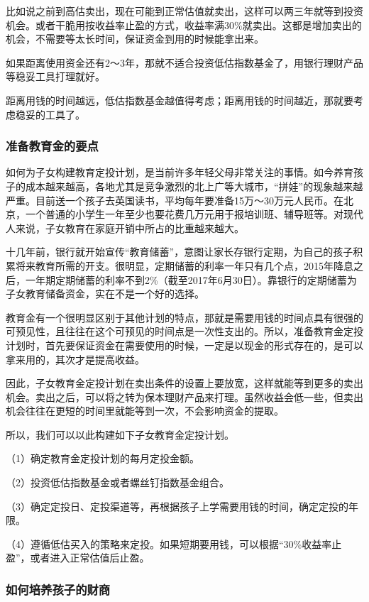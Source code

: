 比如说之前到高估卖出，现在可能到正常估值就卖出，这样可以两三年就等到投资机会。或者干脆用按收益率止盈的方式，收益率满30\%就卖出。这都是增加卖出的机会，不需要等太长时间，保证资金到用的时候能拿出来。

如果距离使用资金还有2～3年，那就不适合投资低估指数基金了，用银行理财产品等稳妥工具打理就好。

距离用钱的时间越远，低估指数基金越值得考虑；距离用钱的时间越近，那就要考虑稳妥的工具了。

\subsubsection{准备教育金的要点}

如何为子女构建教育定投计划，是当前许多年轻父母非常关注的事情。如今养育孩子的成本越来越高，各地尤其是竞争激烈的北上广等大城市，“拼娃”的现象越来越严重。目前送一个孩子去英国读书，平均每年要准备15万～30万元人民币。在北京，一个普通的小学生一年至少也要花费几万元用于报培训班、辅导班等。对现代人来说，子女教育在家庭开销中所占的比重越来越大。

十几年前，银行就开始宣传“教育储蓄”，意图让家长存银行定期，为自己的孩子积累将来教育所需的开支。很明显，定期储蓄的利率一年只有几个点，2015年降息之后，一年期定期储蓄的利率不到2\%（截至2017年6月30日）。靠银行的定期储蓄为子女教育储备资金，实在不是一个好的选择。

教育金有一个很明显区别于其他计划的特点，那就是需要用钱的时间点具有很强的可预见性，且往往在这个可预见的时间点是一次性支出的。所以，准备教育金定投计划时，首先要保证资金在需要使用的时候，一定是以现金的形式存在的，是可以拿来用的，其次才是提高收益。

因此，子女教育金定投计划在卖出条件的设置上要放宽，这样就能等到更多的卖出机会。卖出之后，可以将之转为保本理财产品来打理。虽然收益会低一些，但卖出机会往往在更短的时间里就能等到一次，不会影响资金的提取。

所以，我们可以以此构建如下子女教育金定投计划。

（1）确定教育金定投计划的每月定投金额。

（2）投资低估指数基金或者螺丝钉指数基金组合。

（3）确定定投日、定投渠道等，再根据孩子上学需要用钱的时间，确定定投的年限。

（4）遵循低估买入的策略来定投。如果短期要用钱，可以根据“30\%收益率止盈”，或者进入正常估值后止盈。

\subsubsection{如何培养孩子的财商}

